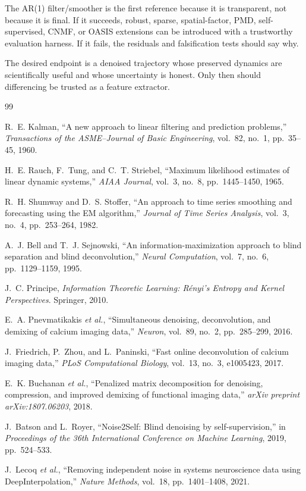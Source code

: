 \documentclass[11pt]{article}
\begin{document}
The AR(1) filter/smoother is the first reference because it is transparent, not
because it is final. If it succeeds, robust, sparse, spatial-factor, PMD,
self-supervised, CNMF, or OASIS extensions can be introduced with a trustworthy
evaluation harness. If it fails, the residuals and falsification tests should
say why.

The desired endpoint is a denoised trajectory whose preserved dynamics are
scientifically useful and whose uncertainty is honest. Only then should
differencing be trusted as a feature extractor.

\begin{thebibliography}{99}

R.~E. Kalman,
``A new approach to linear filtering and prediction problems,''
\emph{Transactions of the ASME--Journal of Basic Engineering},
vol.~82, no.~1, pp.~35--45, 1960.

H.~E. Rauch, F.~Tung, and C.~T. Striebel,
``Maximum likelihood estimates of linear dynamic systems,''
\emph{AIAA Journal}, vol.~3, no.~8, pp.~1445--1450, 1965.

R.~H. Shumway and D.~S. Stoffer,
``An approach to time series smoothing and forecasting using the EM
algorithm,''
\emph{Journal of Time Series Analysis}, vol.~3, no.~4, pp.~253--264, 1982.

A.~J. Bell and T.~J. Sejnowski,
``An information-maximization approach to blind separation and blind
deconvolution,''
\emph{Neural Computation}, vol.~7, no.~6, pp.~1129--1159, 1995.

J.~C. Principe,
\emph{Information Theoretic Learning: R\'enyi's Entropy and Kernel
Perspectives}.
Springer, 2010.

E.~A. Pnevmatikakis \emph{et al.},
``Simultaneous denoising, deconvolution, and demixing of calcium imaging data,''
\emph{Neuron}, vol.~89, no.~2, pp.~285--299, 2016.

J.~Friedrich, P.~Zhou, and L.~Paninski,
``Fast online deconvolution of calcium imaging data,''
\emph{PLoS Computational Biology}, vol.~13, no.~3, e1005423, 2017.

E.~K. Buchanan \emph{et al.},
``Penalized matrix decomposition for denoising, compression, and improved
demixing of functional imaging data,''
\emph{arXiv preprint arXiv:1807.06203}, 2018.

J.~Batson and L.~Royer,
``Noise2Self: Blind denoising by self-supervision,''
in \emph{Proceedings of the 36th International Conference on Machine Learning},
2019, pp.~524--533.

J.~Lecoq \emph{et al.},
``Removing independent noise in systems neuroscience data using
DeepInterpolation,''
\emph{Nature Methods}, vol.~18, pp.~1401--1408, 2021.

\end{thebibliography}
\end{document}
